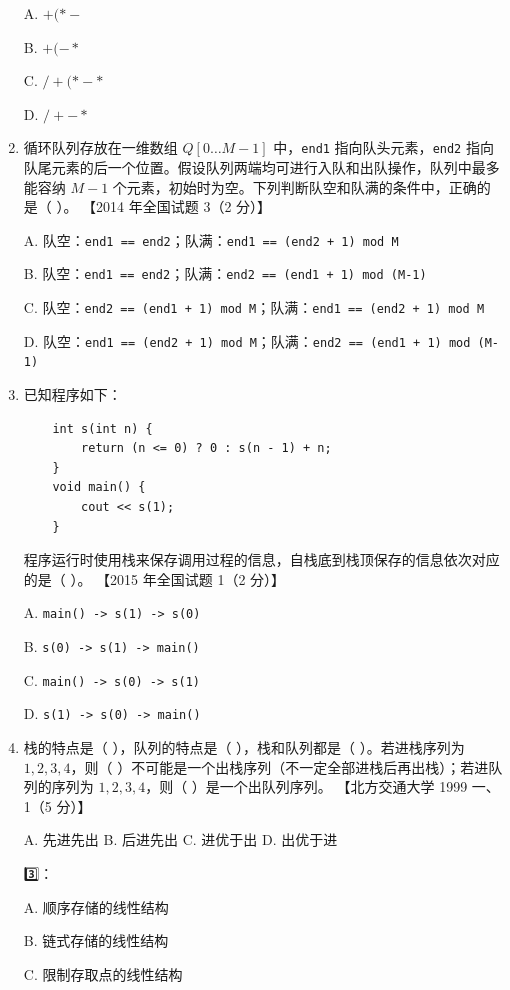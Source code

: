 \documentclass[lang=cn,newtx,10pt,scheme=chinese]{../../elegantbook}
\begin{document}
\begin{enumerate}
    A. $+ ( * -$

    B.  $+ ( - *$

    C.  $/+(*-*$

    D.  $/+-*$

    \item 循环队列存放在一维数组 $Q[0 \ldots M-1]$ 中，\texttt{end1} 指向队头元素，\texttt{end2} 指向队尾元素的后一个位置。假设队列两端均可进行入队和出队操作，队列中最多能容纳 $M-1$ 个元素，初始时为空。下列判断队空和队满的条件中，正确的是（ ）。  
    【2014 年全国试题 3（2 分）】  

    A. 队空：\texttt{end1 == end2}；队满：\texttt{end1 == (end2 + 1) mod M}  

    B. 队空：\texttt{end1 == end2}；队满：\texttt{end2 == (end1 + 1) mod (M-1)}  

    C. 队空：\texttt{end2 == (end1 + 1) mod M}；队满：\texttt{end1 == (end2 + 1) mod M}  

    D. 队空：\texttt{end1 == (end2 + 1) mod M}；队满：\texttt{end2 == (end1 + 1) mod (M-1)}  

    \item 已知程序如下：
    \begin{verbatim}
    int s(int n) {
        return (n <= 0) ? 0 : s(n - 1) + n;
    }
    void main() {
        cout << s(1);
    }
    \end{verbatim}
    程序运行时使用栈来保存调用过程的信息，自栈底到栈顶保存的信息依次对应的是（ ）。  
    【2015 年全国试题 1（2 分）】  

    A. \texttt{main() -> s(1) -> s(0)}  

    B. \texttt{s(0) -> s(1) -> main()}  

    C. \texttt{main() -> s(0) -> s(1)}  

    D. \texttt{s(1) -> s(0) -> main()}  

    \item 栈的特点是（ ），队列的特点是（ ），栈和队列都是（ ）。若进栈序列为 $1, 2, 3, 4$，则（ ）不可能是一个出栈序列（不一定全部进栈后再出栈）；若进队列的序列为 $1, 2, 3, 4$，则（ ）是一个出队列序列。  
    【北方交通大学 1999 一、1（5 分）】  
   
    A. 先进先出 \quad B. 后进先出 \quad C. 进优于出 \quad D. 出优于进  

    3️⃣：  

    A. 顺序存储的线性结构 

    B. 链式存储的线性结构  

    C. 限制存取点的线性结构  


\end{enumerate}
\end{document}
